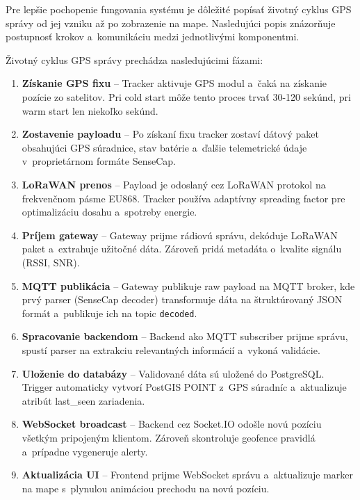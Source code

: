 Pre lepšie pochopenie fungovania systému je dôležité popísať životný cyklus GPS správy od jej vzniku až po zobrazenie na mape. Nasledujúci popis znázorňuje postupnosť krokov a~komunikáciu medzi jednotlivými komponentmi.

Životný cyklus GPS správy prechádza nasledujúcimi fázami:

\begin{enumerate}
    \item \textbf{Získanie GPS fixu} -- Tracker aktivuje GPS modul a~čaká na získanie pozície zo satelitov. Pri cold start môže tento proces trvať 30-120 sekúnd, pri warm start len niekoľko sekúnd.

    \item \textbf{Zostavenie payloadu} -- Po získaní fixu tracker zostaví dátový paket obsahujúci GPS súradnice, stav batérie a~ďalšie telemetrické údaje v~proprietárnom formáte SenseCap.

    \item \textbf{LoRaWAN prenos} -- Payload je odoslaný cez LoRaWAN protokol na frekvenčnom pásme EU868. Tracker používa adaptívny spreading factor pre optimalizáciu dosahu a~spotreby energie.

    \item \textbf{Príjem gateway} -- Gateway prijme rádiovú správu, dekóduje LoRaWAN paket a~extrahuje užitočné dáta. Zároveň pridá metadáta o~kvalite signálu (RSSI, SNR).

    \item \textbf{MQTT publikácia} -- Gateway publikuje raw payload na MQTT broker, kde prvý parser (SenseCap decoder) transformuje dáta na štruktúrovaný JSON formát a~publikuje ich na topic \texttt{decoded}.

    \item \textbf{Spracovanie backendom} -- Backend ako MQTT subscriber prijme správu, spustí parser na extrakciu relevantných informácií a~vykoná validácie.

    \item \textbf{Uloženie do databázy} -- Validované dáta sú uložené do PostgreSQL. Trigger automaticky vytvorí PostGIS POINT z~GPS súradníc a~aktualizuje atribút last\_seen zariadenia.

    \item \textbf{WebSocket broadcast} -- Backend cez Socket.IO odošle novú pozíciu všetkým pripojeným klientom. Zároveň skontroluje geofence pravidlá a~prípadne vygeneruje alerty.

    \item \textbf{Aktualizácia UI} -- Frontend prijme WebSocket správu a~aktualizuje marker na mape s~plynulou animáciou prechodu na novú pozíciu.
\end{enumerate}

